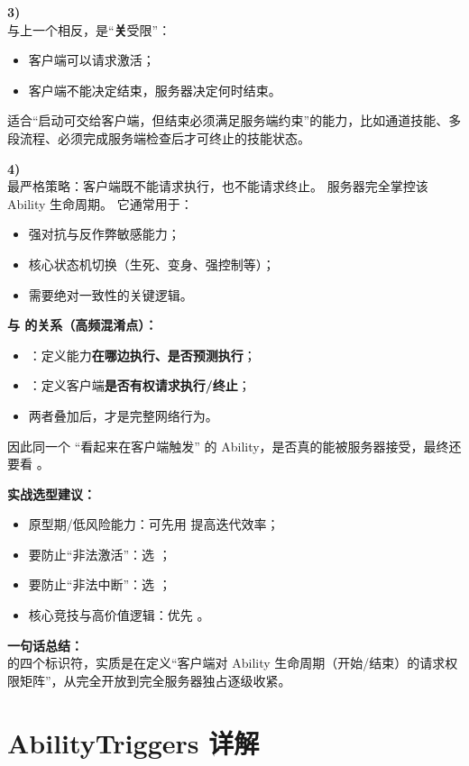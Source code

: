 \documentclass[10pt,CJKmath]{ctexart}
\begin{document}
\textbf{3) }\\
与上一个相反，是“\textbf{关}受限”：  
\begin{itemize}
	\item 客户端可以请求激活；
	\item 客户端不能决定结束，服务器决定何时结束。
\end{itemize}
适合“启动可交给客户端，但结束必须满足服务端约束”的能力，比如通道技能、多段流程、必须完成服务端检查后才可终止的技能状态。

\textbf{4) }\\
最严格策略：客户端既不能请求执行，也不能请求终止。  
服务器完全掌控该 Ability 生命周期。  
它通常用于：
\begin{itemize}
	\item 强对抗与反作弊敏感能力；
	\item 核心状态机切换（生死、变身、强控制等）；
	\item 需要绝对一致性的关键逻辑。
\end{itemize}

\textbf{与  的关系（高频混淆点）：}
\begin{itemize}
	\item {}：定义能力\textbf{在哪边执行、是否预测执行}；
	\item {}：定义客户端\textbf{是否有权请求执行/终止}；
	\item 两者叠加后，才是完整网络行为。
\end{itemize}
因此同一个 “看起来在客户端触发” 的 Ability，是否真的能被服务器接受，最终还要看 。

\textbf{实战选型建议：}
\begin{itemize}
	\item 原型期/低风险能力：可先用  提高迭代效率；
	\item 要防止“非法激活”：选 ；
	\item 要防止“非法中断”：选 ；
	\item 核心竞技与高价值逻辑：优先 。
\end{itemize}

\textbf{一句话总结：}\\
 的四个标识符，实质是在定义“客户端对 Ability 生命周期（开始/结束）的请求权限矩阵”，从完全开放到完全服务器独占逐级收紧。

\section{AbilityTriggers 详解}
\end{document}
